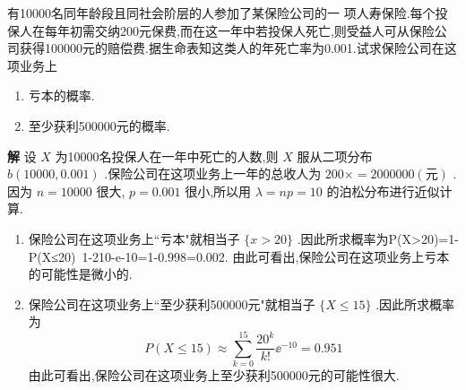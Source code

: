 \begin{example}\label{exam:2.4.7}
	有10000名同年龄段且同社会阶层的人参加了某保险公司的一
	项人寿保险.每个投保人在每年初需交纳200元保费,而在这一年中若投保人死亡,则受益人可从保险公司获得100000元的赔偿费.据生命表知这类人的年死亡率为0.001.试求保险公司在这项业务上
	
	\begin{enumerate}
		\item 亏本的概率.
		\item 至少获利500000元的概率.
	\end{enumerate}
	
	\textbf{解} 设 $ X $ 为10000名投保人在一年中死亡的人数,则 $ X $ 服从二项分布 $ b(10000,0.001) $ .保险公司在这项业务上一年的总收人为 $ 200\times = 2000000(\text{元}) $ .因为 $ n=10000 $ 很大, $ p=0.001 $ 很小,所以用 $ \lambda =np=10 $ 的泊松分布进行近似计算.
	
	\begin{enumerate}
		\item 保险公司在这项业务上``亏本"就相当子 $ \{x>20\} $ .因此所求概率为P(X>20)=1-P(X≤20)~1-210-e-10=1-0.998=0.002.
		由此可看出,保险公司在这项业务上亏本的可能性是微小的.
		\item 保险公司在这项业务上``至少获利500000元"就相当子 $ \{X \leqslant 15\} $ .因此所求概率为
		\[
		P(X \leqslant 15) \approx \sum_{k=0}^{15} \frac{20^{k}}{k !} \ee ^{-10}=0.951
		\]
		由此可看出,保险公司在这项业务上至少获利500000元的可能性很大.
	\end{enumerate}
\end{example}


